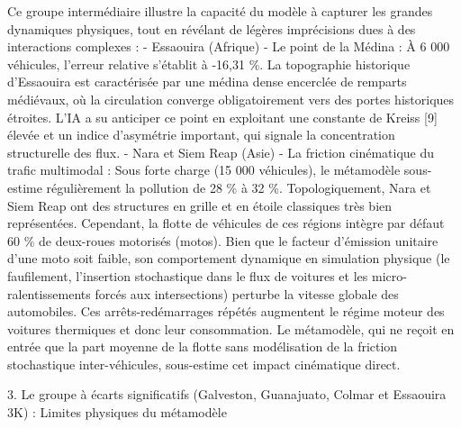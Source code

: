 \documentclass[10pt, a4paper]{article}
\begin{document}
Ce groupe intermédiaire illustre la capacité du modèle à capturer les
grandes dynamiques physiques, tout en révélant de légères imprécisions
dues à des interactions complexes : - Essaouira (Afrique) - Le point de
la Médina : À 6 000 véhicules, l'erreur relative s'établit à -16,31 \%.
La topographie historique d'Essaouira est caractérisée par une médina
dense encerclée de remparts médiévaux, où la circulation converge
obligatoirement vers des portes historiques étroites. L'IA a su
anticiper ce point en exploitant une constante de Kreiss {[}9{]} élevée
et un indice d'asymétrie important, qui signale la concentration
structurelle des flux. - Nara et Siem Reap (Asie) - La friction
cinématique du trafic multimodal : Sous forte charge (15 000 véhicules),
le métamodèle sous-estime régulièrement la pollution de 28 \% à 32 \%.
Topologiquement, Nara et Siem Reap ont des structures en grille et en
étoile classiques très bien représentées. Cependant, la flotte de
véhicules de ces régions intègre par défaut 60 \% de deux-roues
motorisés (motos). Bien que le facteur d'émission unitaire d'une moto
soit faible, son comportement dynamique en simulation physique (le
faufilement, l'insertion stochastique dans le flux de voitures et les
micro-ralentissements forcés aux intersections) perturbe la vitesse
globale des automobiles. Ces arrêts-redémarrages répétés augmentent le
régime moteur des voitures thermiques et donc leur consommation. Le
métamodèle, qui ne reçoit en entrée que la part moyenne de la flotte
sans modélisation de la friction stochastique inter-véhicules,
sous-estime cet impact cinématique direct.

3. Le groupe à écarts significatifs (Galveston, Guanajuato, Colmar et
Essaouira 3K) : Limites physiques du métamodèle
\end{document}
